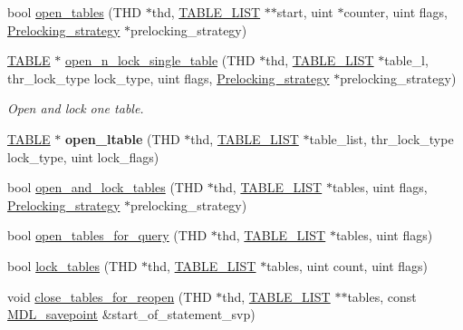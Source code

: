 \begin{DoxyCompactItemize}
\item 
bool \mbox{\hyperlink{group__Data__Dictionary_ga59e488af7a3f47be08fad22370de07c5}{open\+\_\+tables}} (T\+HD $\ast$thd, \mbox{\hyperlink{structTABLE__LIST}{T\+A\+B\+L\+E\+\_\+\+L\+I\+ST}} $\ast$$\ast$start, uint $\ast$counter, uint flags, \mbox{\hyperlink{classPrelocking__strategy}{Prelocking\+\_\+strategy}} $\ast$prelocking\+\_\+strategy)
\item 
\mbox{\hyperlink{structTABLE}{T\+A\+B\+LE}} $\ast$ \mbox{\hyperlink{group__Data__Dictionary_ga86a68932d1c35b3fd820c99d185d7888}{open\+\_\+n\+\_\+lock\+\_\+single\+\_\+table}} (T\+HD $\ast$thd, \mbox{\hyperlink{structTABLE__LIST}{T\+A\+B\+L\+E\+\_\+\+L\+I\+ST}} $\ast$table\+\_\+l, thr\+\_\+lock\+\_\+type lock\+\_\+type, uint flags, \mbox{\hyperlink{classPrelocking__strategy}{Prelocking\+\_\+strategy}} $\ast$prelocking\+\_\+strategy)
\begin{DoxyCompactList}\small\item\em Open and lock one table. \end{DoxyCompactList}\item 
\mbox{\label{group__Data__Dictionary_ga3b5263e110baf47c9fe2f820bc649be5}} 
\mbox{\hyperlink{structTABLE}{T\+A\+B\+LE}} $\ast$ {\bfseries open\+\_\+ltable} (T\+HD $\ast$thd, \mbox{\hyperlink{structTABLE__LIST}{T\+A\+B\+L\+E\+\_\+\+L\+I\+ST}} $\ast$table\+\_\+list, thr\+\_\+lock\+\_\+type lock\+\_\+type, uint lock\+\_\+flags)
\item 
bool \mbox{\hyperlink{group__Data__Dictionary_gab469748dd06a6477d4ce23f742af0794}{open\+\_\+and\+\_\+lock\+\_\+tables}} (T\+HD $\ast$thd, \mbox{\hyperlink{structTABLE__LIST}{T\+A\+B\+L\+E\+\_\+\+L\+I\+ST}} $\ast$tables, uint flags, \mbox{\hyperlink{classPrelocking__strategy}{Prelocking\+\_\+strategy}} $\ast$prelocking\+\_\+strategy)
\item 
bool \mbox{\hyperlink{group__Data__Dictionary_ga6b93d2956c1e654ebe0e48ab3503410d}{open\+\_\+tables\+\_\+for\+\_\+query}} (T\+HD $\ast$thd, \mbox{\hyperlink{structTABLE__LIST}{T\+A\+B\+L\+E\+\_\+\+L\+I\+ST}} $\ast$tables, uint flags)
\item 
bool \mbox{\hyperlink{group__Data__Dictionary_ga399ec28859bb54829b1cabbeed845f78}{lock\+\_\+tables}} (T\+HD $\ast$thd, \mbox{\hyperlink{structTABLE__LIST}{T\+A\+B\+L\+E\+\_\+\+L\+I\+ST}} $\ast$tables, uint count, uint flags)
\item 
void \mbox{\hyperlink{group__Data__Dictionary_ga92bec964ecaaa7270a429e664643b746}{close\+\_\+tables\+\_\+for\+\_\+reopen}} (T\+HD $\ast$thd, \mbox{\hyperlink{structTABLE__LIST}{T\+A\+B\+L\+E\+\_\+\+L\+I\+ST}} $\ast$$\ast$tables, const \mbox{\hyperlink{classMDL__savepoint}{M\+D\+L\+\_\+savepoint}} \&start\+\_\+of\+\_\+statement\+\_\+svp)

\end{DoxyCompactItemize}
